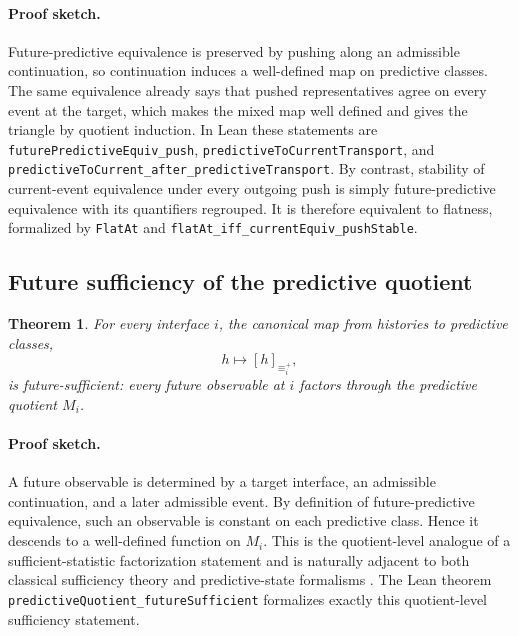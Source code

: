 \documentclass[11pt]{article}
\newcommand{\PredictiveQ}{M}
\newcommand{\FutureEquiv}{\equiv^{+}}
\newtheorem{theorem}{Theorem}[section]
\theoremstyle{definition}
\begin{document}
\paragraph{Proof sketch.}
Future-predictive equivalence is preserved by pushing along an admissible continuation, so continuation induces a well-defined map on predictive classes. The same equivalence already says that pushed representatives agree on every event at the target, which makes the mixed map well defined and gives the triangle by quotient induction. In Lean these statements are \texttt{futurePredictiveEquiv\_push}, \texttt{predictiveToCurrentTransport}, and \texttt{predictiveToCurrent\_after\_predictiveTransport}. By contrast, stability of current-event equivalence under every outgoing push is simply future-predictive equivalence with its quantifiers regrouped. It is therefore equivalent to flatness, formalized by \texttt{FlatAt} and \texttt{flatAt\_iff\_currentEquiv\_pushStable}.

\subsection{Future sufficiency of the predictive quotient}\label{subsec:thm-sufficiency}
\begin{theorem}\label{thm:future-sufficient}
For every interface $i$, the canonical map from histories to predictive classes,
\[
h \longmapsto [h]_{\FutureEquiv_i},
\]
is future-sufficient: every future observable at $i$ factors through the predictive quotient $\PredictiveQ_i$.
\end{theorem}

\paragraph{Proof sketch.}
A future observable is determined by a target interface, an admissible continuation, and a later admissible event. By definition of future-predictive equivalence, such an observable is constant on each predictive class. Hence it descends to a well-defined function on $\PredictiveQ_i$. This is the quotient-level analogue of a sufficient-statistic factorization statement and is naturally adjacent to both classical sufficiency theory and predictive-state formalisms \citep{LehmannCasella1998TheoryPointEstimation,Jaeger2000ObservableOperatorModels,ShaliziCrutchfield2001ComputationalMechanics}. The Lean theorem \texttt{predictiveQuotient\_futureSufficient} formalizes exactly this quotient-level sufficiency statement.
\end{document}
